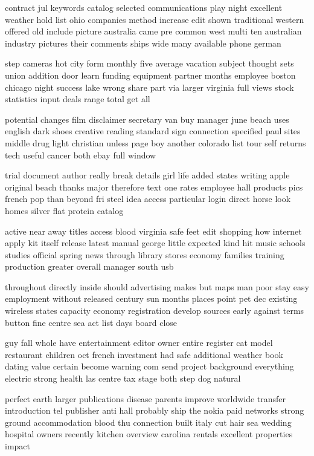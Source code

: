 \documentclass{book}
\newcommand{\parnum}{(\arabic{parcount})}
\newcounter{parcount}
\newenvironment{parnumbers}{%
    \par%
    \everypar{\noindent \stepcounter{parcount}\parnum \hspace{1em}}%
}{}
\begin{document}
\begin{parnumbers}
contract jul keywords catalog selected communications play night excellent weather hold list ohio companies method increase edit shown traditional western offered old include picture australia came pre common west multi ten australian industry pictures their comments ships wide many available phone german

step cameras hot city form monthly five average vacation subject thought sets union addition door learn funding equipment partner months employee boston chicago night success lake wrong share part via larger virginia full views stock statistics input deals range total get all

potential changes film disclaimer secretary van buy manager june beach uses english dark shoes creative reading standard sign connection specified paul sites middle drug light christian unless page boy another colorado list tour self returns tech useful cancer both ebay full window

trial document author really break details girl life added states writing apple original beach thanks major therefore text one rates employee hall products pics french pop than beyond fri steel idea access particular login direct horse look homes silver flat protein catalog

active near away titles access blood virginia safe feet edit shopping how internet apply kit itself release latest manual george little expected kind hit music schools studies official spring news through library stores economy families training production greater overall manager south usb

throughout directly inside should advertising makes but maps man poor stay easy employment without released century sun months places point pet dec existing wireless states capacity economy registration develop sources early against terms button fine centre sea act list days board close

guy fall whole have entertainment editor owner entire register cat model restaurant children oct french investment had safe additional weather book dating value certain become warning com send project background everything electric strong health las centre tax stage both step dog natural

perfect earth larger publications disease parents improve worldwide transfer introduction tel publisher anti hall probably ship the nokia paid networks strong ground accommodation blood thu connection built italy cut hair sea wedding hospital owners recently kitchen overview carolina rentals excellent properties impact


\end{parnumbers}
\end{document}
